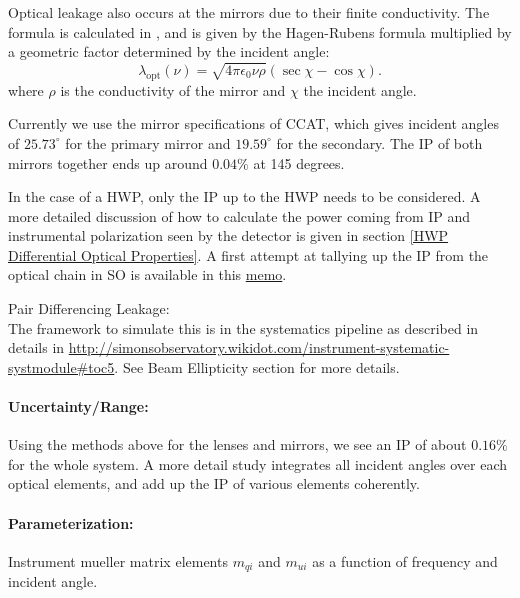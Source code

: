 Optical leakage also occurs at the mirrors due to their finite conductivity. 
The formula is calculated in \cite{Barkats:2005sh}, and is given by the Hagen-Rubens formula multiplied by 
a geometric factor determined by the incident angle:
\begin{equation}
\lambda_\text{opt}(\nu) = \sqrt{4 \pi \epsilon_0 \nu \rho} (\sec \chi - \cos \chi).
\end{equation}
where $\rho$ is the conductivity of the mirror and $\chi$ the incident angle.

Currently we use the mirror specifications of CCAT, which gives incident angles of $25.73^\circ$ for the primary mirror 
and $19.59^\circ$ for the secondary. The IP of both mirrors together ends up around $0.04\%$ at 145 degrees.

In the case of a HWP, only the IP up to the HWP needs to be considered.
A more detailed discussion of how to calculate the power coming from IP and instrumental polarization
seen by the detector is given in section \ref{HWP Differential Optical Properties}.
A first attempt at tallying up the IP from the optical chain in SO is available in this \href{http://simonsobservatory.wdfiles.com/local--files/calandsys-telecon/eb_leakage_from_pointing_error.pdf?ukey=61f26ef33e8439a4e7096ab52c54c523066a4e35}{memo}.


\noindent Pair Differencing Leakage: \\
The framework to simulate this is in the systematics pipeline as described in details in \url{http://simonsobservatory.wikidot.com/instrument-systematic-systmodule#toc5}.
See Beam Ellipticity section for more details.

\paragraph{Uncertainty/Range:}
Using the methods above for the lenses and mirrors, we see an IP of about $0.16\%$ for the whole system.
A more detail study integrates all incident angles over each optical elements, and add up the IP of various elements  coherently.

\paragraph{Parameterization:}
Instrument mueller matrix elements $m_{qi}$ and $m_{ui}$ as a function of frequency and incident angle.


